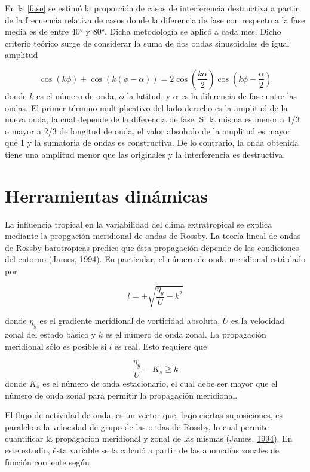 \documentclass[spanish,a4paper,12pt,oneside]{book}
\begin{document}
En la \autoref{fase} se estimó la proporción de casos de interferencia
destructiva a partir de la frecuencia relativa de casos donde la
diferencia de fase con respecto a la fase media es de entre 40° y 80°.
Dicha metodología se aplicó a cada mes. Dicho criterio teórico surge de
considerar la suma de dos ondas sinusoidales de igual amplitud

\[
\cos\left (k\phi \right) + \cos(k(\phi - \alpha)) = 2\cos\left( \frac{k\alpha}{2} \right)\cos\left( k\phi - \frac{\alpha}{2}\right) 
\] donde \(k\) es el número de onda, \(\phi\) la latitud, y \(\alpha\)
es la diferencia de fase entre las ondas. El primer término
multiplicativo del lado derecho es la amplitud de la nueva onda, la cual
depende de la diferencia de fase. Si la misma es menor a 1/3 o mayor a
2/3 de longitud de onda, el valor absoludo de la amplitud es mayor que 1
y la sumatoria de ondas es constructiva. De lo contrario, la onda
obtenida tiene una amplitud menor que las originales y la interferencia
es destructiva.

\section*{Herramientas dinámicas}

La influencia tropical en la variabilidad del clima extratropical se
explica mediante la propgación meridional de ondas de Rossby. La teoría
lineal de ondas de Rossby barotrópicas predice que ésta propagación
depende de las condiciones del entorno (James,
\protect\hyperlink{ref-James}{1994}). En particular, el número de onda
meridional está dado por

\[
l = \pm \sqrt{\frac{\eta_{y}}{U} - k^2}
\]

donde \(\eta_{y}\) es el gradiente meridional de vorticidad absoluta,
\(U\) es la velocidad zonal del estado básico y \(k\) es el número de
onda zonal. La propagación meridional sólo es posible si \(l\) es real.
Esto requiere que

\[
\frac{\eta_{y}}{U} = K_s \ge k 
\] donde \(K_s\) es el número de onda estacionario, el cual debe ser
mayor que el número de onda zonal para permitir la propagación
meridional.

El flujo de actividad de onda, es un vector que, bajo ciertas
suposiciones, es paralelo a la velocidad de grupo de las ondas de
Rossby, lo cual permite cuantificar la propagación meridional y zonal de
las mismas (James, \protect\hyperlink{ref-James}{1994}). En este
estudio, ésta variable se la calculó a partir de las anomalías zonales
de función corriente según
\end{document}
